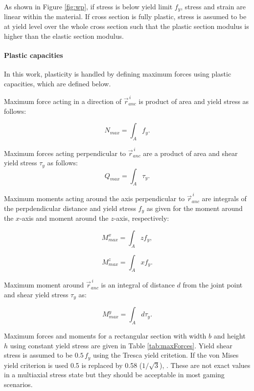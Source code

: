 \documentclass{jcgt}
\begin{document}
As shown in Figure \ref{fig:wp}, if stress is below yield limit $f_y$, stress and strain are linear within the material.
If cross section is fully plastic, stress is assumed to be at yield level over the whole cross section such that 
the plastic section modulus is higher than the elastic section modulus.

\paragraph{Plastic capacities}
In this work, plasticity is handled by defining maximum forces using plastic capacities, which are defined below.

Maximum force acting in a direction of $\vec{r}_{anc}^{\,i} $
is product of area and yield stress as follows:

\begin{equation} \label{eq:fN}
N_{max}= \int_A f_y.
\end{equation}

Maximum forces acting perpendicular to $\vec{r}_{anc}^{\,i} $
are a product of area and shear yield stress $\tau_y$ as follows:
\begin{equation} \label{eq:fQ}
Q_{max}= \int_A \tau_y.
\end{equation}

Maximum moments acting around the axis perpendicular to $\vec{r}_{anc}^{\,i} $
are integrals of the perpdendicular distance 
and yield stress $f_y$ as given for the moment around the $x$-axis 
and moment around the $z$-axis, respectively:

\begin{equation} \label{eq:Mx}
M_{max}^x= \int_A z f_y,
\end{equation}

\begin{equation} \label{eq:Mz}
M_{max}^z= \int_A x f_y.
\end{equation}

Maximum moment around $\vec{r}_{anc}^{\,i} $
is an integral of distance $d$ from the joint point
and shear yield stress $\tau_y$ as: 

\begin{equation} \label{eq:My}
M_{max}^y= \int_A d \tau_y.
\end{equation}

Maximum forces and moments for a
rectangular section with width $b$ and height $h$ using constant yield stress
are given in Table \ref{tab:maxForces}.
Yield shear stress is assumed to be $ 0.5\, f_y$ using the Tresca yield critetion.
If the von Mises yield criterion is used 0.5 is replaced by 0.58 ($1/\sqrt{3}$), \cite{dowling}.
These are not exact values in a multiaxial stress state but they
should be acceptable in most gaming scenarios.
\end{document}
